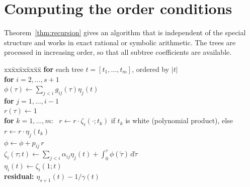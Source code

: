 \documentclass[11pt,a4paper]{article}
\theoremstyle{definition}
\theoremstyle{remark}
\newcommand{\dd}{\,\mathrm{d}}
\begin{document}
\section{Computing the order conditions}
\label{sec:algorithm}

Theorem~\ref{thm:recursion} gives an algorithm that is independent of the special structure and works in exact rational
or symbolic arithmetic. The trees are processed in increasing order, so that all subtree coefficients are available.

\begin{center}
\begin{minipage}{0.9\linewidth}
\begin{tabbing}
xx\=xx\=xx\=xx\=xx\=\kill
\textbf{for} each tree $t=[t_1,\dots,t_m]$, ordered by $|t|$\\
\>\textbf{for} $i=2,\dots,s+1$\\
\>\>$\phi(\tau)\gets\sum_{j<i}g_{ij}(\tau)\eta_j(t)$\\
\>\>\textbf{for} $j=1,\dots,i-1$\\
\>\>\>$r(\tau)\gets1$\\
\>\>\>\textbf{for} $k=1,\dots,m$: \ $r\gets r\cdot\zeta_i(\cdot;t_k)$ if $t_k$ is white (polynomial product), else $r\gets r\cdot\eta_j(t_k)$\\
\>\>\>$\phi\gets\phi+p_{ij}\,r$\\
\>\>$\zeta_i(\tau;t)\gets\sum_{j<i}\alpha_{ij}\eta_j(t)+\int_0^\tau\phi(\tilde\tau)\dd\tilde\tau$\\
\>\>$\eta_i(t)\gets\zeta_i(1;t)$\\
\textbf{residual:} $\eta_{s+1}(t)-1/\gamma(t)$
\end{tabbing}
\end{minipage}
\end{center}
\end{document}
